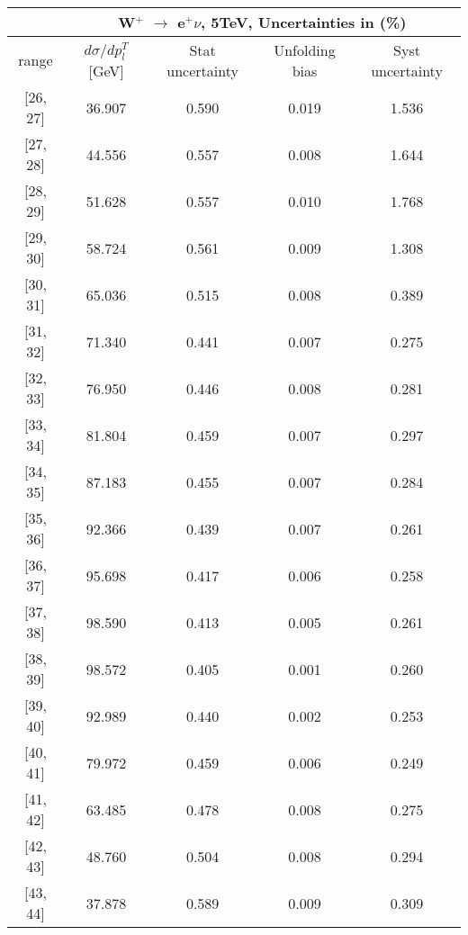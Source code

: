 \documentclass[12pt]{article}
\begin{document}
 
\begin{table}[] 
\begin{tabular}{c|c|c|c|c|}
\cline{2-5}
& \multicolumn{4}{c|}{W$^{+}$ $\rightarrow$ e$^{+} \nu $, 5TeV, Uncertainties in (\%)}  \\ \hline \hline 
\multicolumn{1}{|c|}{  range } & $d\sigma$/$dp^{T}_{l}$ [GeV]     & Stat uncertainty     & Unfolding bias     & Syst uncertainty        \\ \hline \hline 
\multicolumn{1}{|c|}{{[}26,  27{]}}  & 36.907 & 0.590 & 0.019 & 1.536 \\ \hline 
\multicolumn{1}{|c|}{{[}27,  28{]}}  & 44.556 & 0.557 & 0.008 & 1.644 \\ \hline 
\multicolumn{1}{|c|}{{[}28,  29{]}}  & 51.628 & 0.557 & 0.010 & 1.768 \\ \hline 
\multicolumn{1}{|c|}{{[}29,  30{]}}  & 58.724 & 0.561 & 0.009 & 1.308 \\ \hline 
\multicolumn{1}{|c|}{{[}30,  31{]}}  & 65.036 & 0.515 & 0.008 & 0.389 \\ \hline 
\multicolumn{1}{|c|}{{[}31,  32{]}}  & 71.340 & 0.441 & 0.007 & 0.275 \\ \hline 
\multicolumn{1}{|c|}{{[}32,  33{]}}  & 76.950 & 0.446 & 0.008 & 0.281 \\ \hline 
\multicolumn{1}{|c|}{{[}33,  34{]}}  & 81.804 & 0.459 & 0.007 & 0.297 \\ \hline 
\multicolumn{1}{|c|}{{[}34,  35{]}}  & 87.183 & 0.455 & 0.007 & 0.284 \\ \hline 
\multicolumn{1}{|c|}{{[}35,  36{]}}  & 92.366 & 0.439 & 0.007 & 0.261 \\ \hline 
\multicolumn{1}{|c|}{{[}36,  37{]}}  & 95.698 & 0.417 & 0.006 & 0.258 \\ \hline 
\multicolumn{1}{|c|}{{[}37,  38{]}}  & 98.590 & 0.413 & 0.005 & 0.261 \\ \hline 
\multicolumn{1}{|c|}{{[}38,  39{]}}  & 98.572 & 0.405 & 0.001 & 0.260 \\ \hline 
\multicolumn{1}{|c|}{{[}39,  40{]}}  & 92.989 & 0.440 & 0.002 & 0.253 \\ \hline 
\multicolumn{1}{|c|}{{[}40,  41{]}}  & 79.972 & 0.459 & 0.006 & 0.249 \\ \hline 
\multicolumn{1}{|c|}{{[}41,  42{]}}  & 63.485 & 0.478 & 0.008 & 0.275 \\ \hline 
\multicolumn{1}{|c|}{{[}42,  43{]}}  & 48.760 & 0.504 & 0.008 & 0.294 \\ \hline 
\multicolumn{1}{|c|}{{[}43,  44{]}}  & 37.878 & 0.589 & 0.009 & 0.309 \\ \hline 

\end{tabular}
\end{table}
\end{document}
